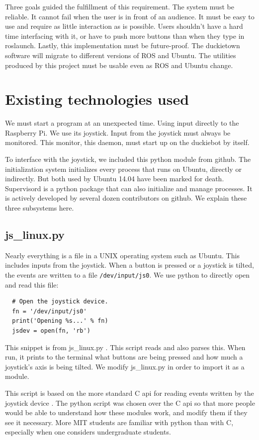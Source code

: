 \documentclass[titlepage]{article}
\begin{document}
Three goals guided the fulfillment of this requirement. The system must be reliable. It cannot fail when the user is in front of an audience. It must be easy to use and require as little interaction as is possible. Users shouldn't have a hard time interfacing with it, or have to push more buttons than when they type in roslaunch.
Lastly, this implementation must be future-proof. The duckietown software will migrate to  different versions of ROS and Ubuntu. The utilities produced by this project must be usable even as ROS and Ubuntu change. 
\section{Existing technologies used} 
We must start a program at an unexpected time. Using input directly to the Raspberry Pi. We use its joystick. Input from the joystick must always be monitored. This monitor, this daemon, must start up on the duckiebot by itself. 

To interface with the joystick, we included this python module from github. 
The initialization system initializes every process that runs on Ubuntu, directly or indirectly. But both used by Ubuntu 14.04 have been marked for death.
Supervisord is a python package that can also initialize and manage processes. It is actively developed by several dozen contributors on github.
We explain these three subsystems here. 
\subsection{js\_linux.py}
Nearly everything is a file in a UNIX operating system such as Ubuntu. This includes inputs from the joystick. When a button is pressed or a joystick is tilted, the events are written to a file \texttt{/dev/input/js0}. We use python to directly open and read this file:

\begin{lstlisting}
  # Open the joystick device.
  fn = '/dev/input/js0' 
  print('Opening %s...' % fn)
  jsdev = open(fn, 'rb')
\end{lstlisting}

This snippet is from js\_linux.py \cite{rdb}. This script reads and also parses this. When run, it prints to the terminal what buttons are being pressed and how much a joystick's axis is being tilted. We modify js\_linux.py in order to import it as a module. 

This script is based on the more standard C api for reading events written by the joystick device \cite{linux joystick}. The python script was chosen over the C api so that more people would be able to understand how these modules work, and modify them if they see it necessary. More MIT students are familiar with python than with C, especially when one considers undergraduate students.
\end{document}
